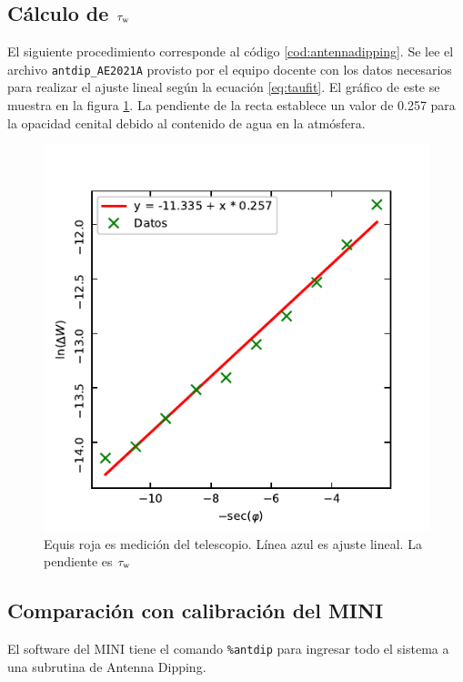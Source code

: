\subsection{Cálculo de $\tau_\textnormal{w}$}

El siguiente procedimiento corresponde al código \ref{cod:antennadipping}. Se lee el archivo \texttt{antdip\_AE2021A} provisto por el equipo docente con los datos necesarios para realizar el ajuste lineal según la ecuación \ref{eq:taufit}. El gráfico de este se muestra en la figura \ref{fig:taufit}. La pendiente de la recta establece un valor de \num{0.257} para la opacidad cenital debido al contenido de agua en la atmósfera.

\begin{figure}[p]
	\centering
	\includegraphics{taufit.pdf}
	\caption{Equis roja es medición del telescopio. Línea azul es ajuste lineal. La pendiente es $\tau_\textnormal{w}$}
	\label{fig:taufit}
\end{figure}

\subsection{Comparación con calibración del MINI}

El software del MINI tiene el comando \texttt{\%antdip} para ingresar todo el sistema a una subrutina de Antenna Dipping.

